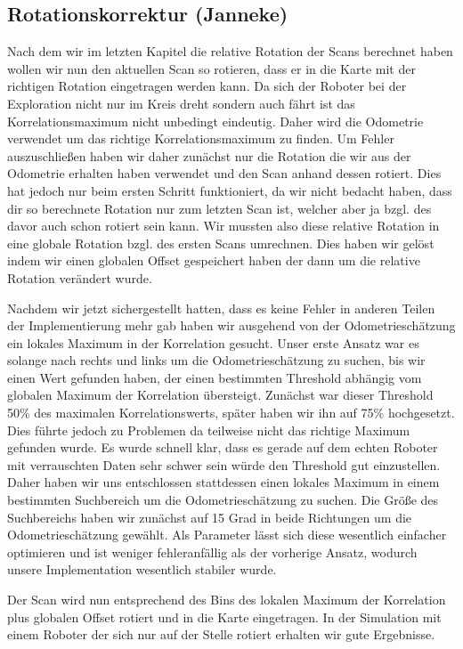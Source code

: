 \subsection{Rotationskorrektur (Janneke)}

Nach dem wir im letzten Kapitel die relative Rotation der Scans berechnet haben wollen wir nun den aktuellen Scan so rotieren, dass er in die Karte mit der richtigen Rotation eingetragen werden kann. Da sich der Roboter bei der Exploration nicht nur im Kreis dreht sondern auch fährt ist das Korrelationsmaximum nicht unbedingt eindeutig. Daher wird die Odometrie verwendet um das richtige Korrelationsmaximum zu finden. Um Fehler auszuschließen haben wir daher zunächst nur die Rotation die wir aus der Odometrie erhalten haben verwendet und den Scan anhand dessen rotiert. Dies hat jedoch nur beim ersten Schritt funktioniert, da wir nicht bedacht haben, dass dir so berechnete Rotation nur zum letzten Scan ist, welcher aber ja bzgl. des davor auch schon rotiert sein kann. Wir mussten also diese relative Rotation in eine globale Rotation bzgl. des ersten Scans umrechnen. Dies haben wir gelöst indem wir einen globalen Offset gespeichert haben der dann um die relative Rotation verändert wurde.

Nachdem wir jetzt sichergestellt hatten, dass es keine Fehler in anderen Teilen der Implementierung mehr gab haben wir ausgehend von der Odometrieschätzung ein lokales Maximum in der Korrelation gesucht. Unser erste Ansatz war es solange nach rechts und links um die Odometrieschätzung zu suchen, bis wir einen Wert gefunden haben, der einen bestimmten Threshold abhängig vom globalen Maximum der Korrelation übersteigt. Zunächst war dieser Threshold 50\% des maximalen Korrelationswerts, später haben wir ihn auf 75\% hochgesetzt. Dies führte jedoch zu Problemen da teilweise nicht das richtige Maximum gefunden wurde. Es wurde schnell klar, dass es gerade auf dem echten Roboter mit verrauschten Daten sehr schwer sein würde den Threshold gut einzustellen. Daher haben wir uns entschlossen stattdessen einen lokales Maximum in einem bestimmten Suchbereich um die Odometrieschätzung zu suchen. Die Größe des Suchbereichs haben wir zunächst auf 15 Grad in beide Richtungen um die Odometrieschätzung gewählt. Als Parameter lässt sich diese wesentlich einfacher optimieren und ist weniger fehleranfällig als der vorherige Ansatz, wodurch unsere Implementation wesentlich stabiler wurde.

Der Scan wird nun entsprechend des Bins des lokalen Maximum der Korrelation plus globalen Offset rotiert und in die Karte eingetragen. In der Simulation mit einem Roboter der sich nur auf der Stelle rotiert erhalten wir gute Ergebnisse.

